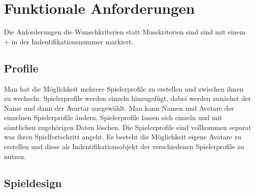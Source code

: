 \section{Funktionale Anforderungen}

Die Anforderungen die Wunschkriterien statt Musskriterien sind sind mit einem + in der Indentifikationsnummer markiert.

\subsection{Profile}

\begin{requirements}
	Man hat die Möglichkeit mehrere Spielerprofile zu erstellen und zwischen ihnen zu wechseln.
	 Spielerprofile werden einzeln hinzugefügt, dabei werden zunächst der Name und 	dann der Avartar ausgewählt.
	 Man kann Namen und Avatare der einzelnen Spielerprofile ändern.
	 Spielerprofile lassen sich einzeln und mit sämtlichen zugehörigen Daten löschen.
	Die Spielerprofile sind vollkommen separat was ihren Spielfortschritt angeht. 
	Es besteht die Möglichkeit eigene Avatare zu erstellen und diese als Indentifikationsobjekt der verschiedenen Spielerprofile zu nutzen.
\end{requirements}

\subsection{Spieldesign}

